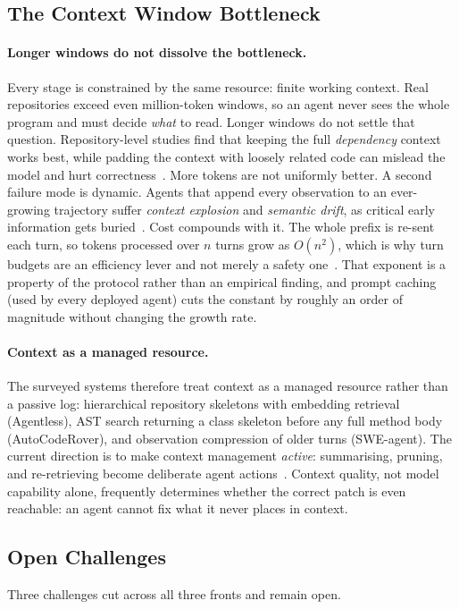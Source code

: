\documentclass[
  english,        %
  font=times,     %
  twocolumn,      %
]{tumarticle}
\begin{document}
\subsection{The Context Window Bottleneck}
\paragraph{Longer windows do not dissolve the bottleneck.}
Every stage is constrained by the same resource: finite working context. Real
repositories exceed even million-token windows, so an agent never sees the whole
program and must decide \emph{what} to read. Longer windows do not settle that
question. Repository-level studies find that keeping the full \emph{dependency}
context works best, while padding the context with loosely related code can
mislead the model and hurt correctness~\cite{repoexec2025}. More tokens are not
uniformly better. A second failure mode is dynamic. Agents that append every
observation to an ever-growing trajectory suffer \emph{context explosion} and
\emph{semantic drift}, as critical early information gets
buried~\cite{contextastool2025}. Cost compounds with it. The whole prefix is
re-sent each turn, so tokens processed over $n$ turns grow as $O(n^2)$, which is
why turn budgets are an efficiency lever and not merely a safety
one~\cite{turncontrol2025}. That exponent is a property of the protocol rather
than an empirical finding, and prompt caching (used by every deployed agent) cuts
the constant by roughly an order of magnitude without changing the growth rate.

\paragraph{Context as a managed resource.}
The surveyed systems therefore treat context as a managed resource rather than a
passive log: hierarchical repository skeletons with embedding retrieval
(Agentless), AST search returning a class skeleton before any full method body
(AutoCodeRover), and observation compression of older turns (SWE-agent). The
current direction is to make context management \emph{active}: summarising,
pruning, and re-retrieving become deliberate agent
actions~\cite{contextastool2025}. Context quality, not model capability alone,
frequently determines whether the correct patch is even reachable: an agent cannot
fix what it never places in context.

\subsection{Open Challenges}
\label{sec:open}
Three challenges cut across all three fronts and remain open.
\end{document}
